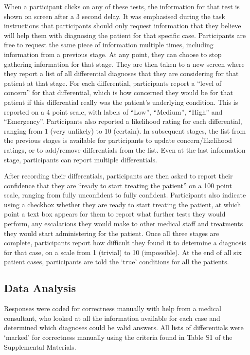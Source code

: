 \documentclass[a4paper, nobind]{templates/ociamthesis}
\begin{document}
When a participant clicks on any of these tests, the information for that test is shown on screen after a 3 second delay. It was emphasised during the task instructions that participants should only request information that they believe will help them with diagnosing the patient for that specific case. Participants are free to request the same piece of information multiple times, including information from a previous stage. At any point, they can choose to stop gathering information for that stage. They are then taken to a new screen where they report a list of all differential diagnoses that they are considering for that patient at that stage. For each differential, participants report a ``level of concern'' for that differential, which is how concerned they would be for that patient if this differential really was the patient's underlying condition. This is reported on a 4 point scale, with labels of ``Low'', ``Medium'', ``High'' and ``Emergency''. Participants also reported a likelihood rating for each differential, ranging from 1 (very unlikely) to 10 (certain). In subsequent stages, the list from the previous stages is available for participants to update concern/likelihood ratings, or to add/remove differentials from the list. Even at the last information stage, participants can report multiple differentials.

After recording their differentials, participants are then asked to report their confidence that they are ``ready to start treating the patient'' on a 100 point scale, ranging from fully unconfident to fully confident. Participants also indicate using a checkbox whether they are ready to start treating the patient, at which point a text box appears for them to report what further tests they would perform, any escalations they would make to other medical staff and treatments they would start administering for the patient. Once all three stages are complete, participants report how difficult they found it to determine a diagnosis for that case, on a scale from 1 (trivial) to 10 (impossible). At the end of all six patient cases, participants are told the `true' conditions for all the patients.

\hypertarget{data-analysis}{%
\subsection*{Data Analysis}\label{data-analysis}}

Responses were coded for correctness manually with help from a medical consultant, who looked at all the information available for each case and determined which diagnoses could be valid answers. All lists of differentials were `marked' for correctness manually using the criteria found in Table S1 of the Supplemental Materials.
\end{document}
